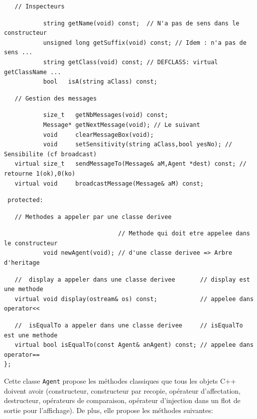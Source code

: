 \documentclass[12pt]{article}
\begin{document}
\begin{footnotesize}
\begin{verbatim}
   // Inspecteurs
\end{verbatim}
\begin{verbatim}
           string getName(void) const;  // N'a pas de sens dans le constructeur
           unsigned long getSuffix(void) const; // Idem : n'a pas de sens ...
           string getClass(void) const; // DEFCLASS: virtual getClassName ...
           bool   isA(string aClass) const;
\end{verbatim}
\begin{verbatim}
   // Gestion des messages
\end{verbatim}
\begin{verbatim}
           size_t   getNbMessages(void) const;
           Message* getNextMessage(void); // Le suivant
           void     clearMessageBox(void);
           void     setSensitivity(string aClass,bool yesNo); // Sensibilite (cf broadcast)
   virtual size_t   sendMessageTo(Message& aM,Agent *dest) const; // retourne 1(ok),0(ko)
   virtual void     broadcastMessage(Message& aM) const;
\end{verbatim}
\begin{verbatim}
 protected:
\end{verbatim}
\begin{verbatim}
   // Methodes a appeler par une classe derivee
\end{verbatim}
\begin{verbatim}
                                // Methode qui doit etre appelee dans le constructeur
           void newAgent(void); // d'une classe derivee => Arbre d'heritage
\end{verbatim}
\begin{verbatim}
   //  display a appeler dans une classe derivee       // display est une methode
   virtual void display(ostream& os) const;            // appelee dans operator<<
\end{verbatim}
\begin{verbatim}
   //  isEqualTo a appeler dans une classe derivee     // isEqualTo est une methode
   virtual bool isEqualTo(const Agent& anAgent) const; // appelee dans operator==
};
\end{verbatim}
\end{footnotesize}

Cette classe {\tt Agent} propose les m\'ethodes classiques que
tous les objets C++ doivent avoir (constructeur, constructeur par recopie,
op\'erateur d'affectation, destructeur, op\'erateurs de comparaison,
op\'erateur d'injection dans un flot de sortie pour l'affichage).
De plus, elle propose les m\'ethodes suivantes:
\end{document}
